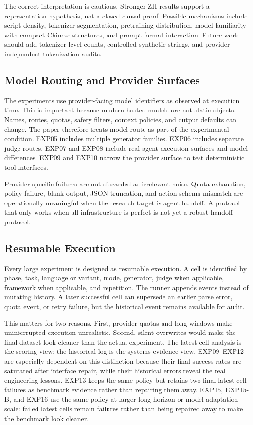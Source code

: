\documentclass[11pt]{article}
\begin{document}
The correct interpretation is cautious. Stronger ZH results support a representation hypothesis, not a closed causal proof. Possible mechanisms include script density, tokenizer segmentation, pretraining distribution, model familiarity with compact Chinese structures, and prompt-format interaction. Future work should add tokenizer-level counts, controlled synthetic strings, and provider-independent tokenization audits.

\subsection{Model Routing and Provider Surfaces}
The experiments use provider-facing model identifiers as observed at execution time. This is important because modern hosted models are not static objects. Names, routes, quotas, safety filters, context policies, and output defaults can change. The paper therefore treats model route as part of the experimental condition. EXP05 includes multiple generator families. EXP06 includes separate judge routes. EXP07 and EXP08 include real-agent execution surfaces and model differences. EXP09 and EXP10 narrow the provider surface to test deterministic tool interfaces.

Provider-specific failures are not discarded as irrelevant noise. Quota exhaustion, policy failure, blank output, JSON truncation, and action-schema mismatch are operationally meaningful when the research target is agent handoff. A protocol that only works when all infrastructure is perfect is not yet a robust handoff protocol.

\subsection{Resumable Execution}
Every large experiment is designed as resumable execution. A cell is identified by phase, task, language or variant, mode, generator, judge when applicable, framework when applicable, and repetition. The runner appends events instead of mutating history. A later successful cell can supersede an earlier parse error, quota event, or retry failure, but the historical event remains available for audit.

This matters for two reasons. First, provider quotas and long windows make uninterrupted execution unrealistic. Second, silent overwrites would make the final dataset look cleaner than the actual experiment. The latest-cell analysis is the scoring view; the historical log is the systems-evidence view. EXP09--EXP12 are especially dependent on this distinction because their final success rates are saturated after interface repair, while their historical errors reveal the real engineering lessons. EXP13 keeps the same policy but retains two final latest-cell failures as benchmark evidence rather than repairing them away. EXP15, EXP15-B, and EXP16 use the same policy at larger long-horizon or model-adaptation scale: failed latest cells remain failures rather than being repaired away to make the benchmark look cleaner.
\end{document}
